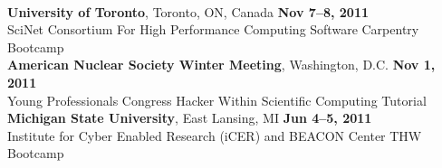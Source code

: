 \documentclass[margin,line]{resume}
\begin{document}
\begin{resume}
               \vspace{2mm}\\
    \textbf{University of Toronto}, Toronto, ON, Canada \hfill \textbf{Nov 7--8, 2011}\\
    SciNet Consortium For High Performance Computing Software Carpentry Bootcamp
               \vspace{2mm}\\
    \textbf{American Nuclear Society Winter Meeting}, Washington, D.C.  \hfill \textbf{Nov 1, 2011}\\
    Young Professionals Congress Hacker Within Scientific Computing Tutorial
               \vspace{2mm}\\
    \textbf{Michigan State University}, East Lansing, MI \hfill \textbf{Jun 4--5, 2011}\\
    Institute for Cyber Enabled Research (iCER) and BEACON Center THW Bootcamp


\end{resume}
\end{document}
